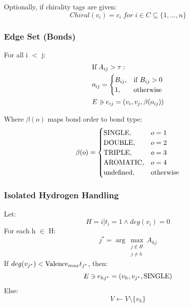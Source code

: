 \documentclass[conference]{IEEEtran}
\begin{document}
\textnormal{Optionally, if chirality tags are given:}
\begin{equation}
    Chiral(v_i) = c_i \; for \; i \in C \subseteq \{1,...,n\}
    \label{eq:chiral}
\end{equation}

\subsubsection{Edge Set (Bonds)}
\textnormal{For all i \begin{math} < \end{math} j:}
\begin{equation}
    \begin{align}
        &\textnormal{If} \; A_{ij} > \tau: \quad \\
        &o_{ij} = 
        \begin{cases}
            B_{ij}, & \textnormal{if } B_{ij} > 0 \\
            1, & \textnormal{otherwise}
        \end{cases} \notag \\
            &E \ni e_{ij} = (v_i, v_j, \beta(o_{ij}))
    \end{align}
    \label{eq:bond_definition}
\end{equation}
    
\textnormal{Where $\beta(o)$ maps bond order to bond type:}
\begin{equation}
    \beta (o) = \begin{cases}
    \textnormal{\uppercase{single}}, & o=1 \\
    \textnormal{\uppercase{double}}, & o=2 \\
    \textnormal{\uppercase{triple}}, & o=3 \\
    \textnormal{\uppercase{aromatic}}, & o=4 \\
    \textnormal{undefined}, & \textnormal{otherwise}
    \end{cases}
\label{eq:bond_type}
\end{equation}

\subsubsection{Isolated Hydrogen Handling}
\textnormal{Let:}
\begin{equation}
    H = {i | t_i = 1 \wedge deg(v_i) = 0}
    \label{eq:iso_hydro}
\end{equation}
\textnormal{For each h $\in$ H:}
\begin{equation}
    j^* = \arg\max_{\substack{j \notin H \\ j \ne h}} A_{hj}
    \label{eq:argmax}
\end{equation}
\textnormal{If $deg(v_{j^*}) < \textnormal{Valence}_{max}t_{j^*}$, then:}
\begin{equation}
    E \ni e_{hj^*} = (v_h, v_{j^*}, \textnormal{\uppercase{single}})
    \label{eq:bond_hydro}
\end{equation}
\textnormal{Else:}
\begin{equation}
    V \leftarrow V \setminus \{ v_h \}
    \label{eq:remove_hydro}
\end{equation}
\end{document}
